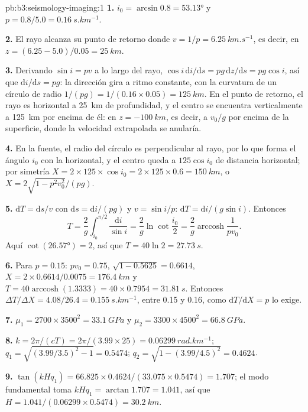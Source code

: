 \begin{solution}{pb:b3:seismology-imaging:1}
\textbf{1.} $i_0 = \arcsin 0.8 = \ang{53.13}$ y $p = 0.8/5.0 =
\qty{0.16}{s.km^{-1}}$.

\textbf{2.} El rayo alcanza su punto de retorno donde $v = 1/p = \qty{6.25}{km.s^{-1}}$, es decir, en
$z = (6.25 - 5.0)/0.05 = \qty{25}{km}$.

\textbf{3.} Derivando $\sin i = pv$ a lo largo del rayo, $\cos i\,\mathrm di/
\mathrm ds = pg\,\mathrm dz/\mathrm ds = pg\cos i$, así que $\mathrm di/\mathrm ds =
pg$: la dirección gira a ritmo constante, con la curvatura de un círculo de radio
$1/(pg) = 1/(0.16\times0.05) = \qty{125}{km}$. En el punto de retorno, el rayo es
horizontal a \qty{25}{km} de profundidad, y el centro se encuentra verticalmente a \qty{125}{km}
por encima de él: en $z = \qty{-100}{km}$, es decir, a $v_0/g$ por encima de la superficie, donde la
velocidad extrapolada se anularía.

\textbf{4.} En la fuente, el radio del círculo es perpendicular al rayo,
por lo que forma el ángulo $i_0$ con la horizontal, y el centro queda
a $125\cos i_0$ de distancia horizontal; por simetría
$X = 2\times125\times\cos i_0 = 2\times125\times0.6 = \qty{150}{km}$, o
$X = 2\sqrt{1 - p^2v_0^2}/(pg)$.

\textbf{5.} $\mathrm dT = \mathrm ds/v$ con $\mathrm ds = \mathrm di/(pg)$ y
$v = \sin i/p$: $\mathrm dT = \mathrm di/(g\sin i)$. Entonces
\[
  T = \frac2g\int_{i_0}^{\pi/2}\frac{\mathrm di}{\sin i} = \frac2g\ln\cot\frac{i_0}2 =
  \frac2g\operatorname{arccosh}\frac1{pv_0} .
\]
Aquí $\cot(\ang{26.57}) = 2$, así que
$T = 40\ln2 = \qty{27.73}{s}$.

\textbf{6.} Para $p = 0.15$: $pv_0 = 0.75$, $\sqrt{1 - 0.5625} = 0.6614$,
$X = 2\times0.6614/0.0075 = \qty{176.4}{km}$ y $T = 40\operatorname{arccosh}
(1.3333) = 40\times0.7954 = \qty{31.81}{s}$. Entonces $\Delta T/\Delta X =
4.08/26.4 = \qty{0.155}{s.km^{-1}}$, entre 0.15 y 0.16, como
$\mathrm dT/\mathrm dX = p$ lo exige.

\textbf{7.} $\mu_1 = 2700\times3500^2 = \qty{33.1}{GPa}$ y
$\mu_2 = 3300\times4500^2 = \qty{66.8}{GPa}$.

\textbf{8.} $k = 2\pi/(cT) = 2\pi/(3.99\times25) = \qty{0.06299}{rad.km^{-1}}$;
$q_1 = \sqrt{(3.99/3.5)^2 - 1} = 0.5474$; $q_2 = \sqrt{1 - (3.99/4.5)^2} = 0.4624$.

\textbf{9.} $\tan(kHq_1) = 66.825\times0.4624/(33.075\times0.5474) = 1.707$; el
modo fundamental toma $kHq_1 = \arctan1.707 = 1.041$, así que
$H = 1.041/(0.06299\times0.5474) = \qty{30.2}{km}$.


\end{solution}
